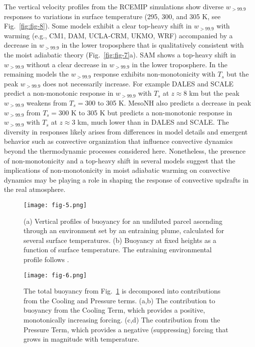 \documentclass[draft]{ametsocV6.1}
\begin{document}
The vertical velocity profiles from the RCEMIP simulations show diverse $w_{>99.9}$ responses to variations in surface temperature (295, 300, and 305 K, see Fig.~\ref{fig:fig-8}). Some models exhibit a clear top-heavy shift in $w_{>99.9}$ with warming (e.g., CM1, DAM, UCLA-CRM, UKMO, WRF) accompanied by a decrease in $w_{>99.9}$ in the lower troposphere that is qualitatively consistent with the moist adiabatic theory (Fig.~\ref{fig:fig-7}a). SAM shows a top-heavy shift in $w_{>99.9}$ without a clear decrease in $w_{>99.9}$ in the lower troposphere. In the remaining models the $w_{>99.9}$ response exhibits non-monotonicity with $T_s$ but the peak $w_{>99.9}$ does not necessarily increase. For example DALES and SCALE predict a non-monotonic response in $w_{>99.9}$ with $T_s$ at $z\approx8$ km but the peak $w_{>99.9}$ weakens from $T_s=300$ to 305 K. MesoNH also predicts a decrease in peak $w_{>99.9}$ from $T_s=300$ K to 305 K but predicts a non-monotonic response in $w_{>99.9}$ with $T_s$ at $z\approx3$ km, much lower than in DALES and SCALE. The diversity in responses likely arises from differences in model details and emergent behavior such as convective organization that influence convective dynamics beyond the thermodynamic processes considered here. Nonetheless, the presence of non-monotonicity and a top-heavy shift in several models suggest that the implications of non-monotonicity in moist adiabatic warming on convective dynamics may be playing a role in shaping the response of convective updrafts in the real atmosphere.

\begin{figure}[htbp]
 \centering
 \texttt{[image: fig-5.png]}\\
 \caption{(a) Vertical profiles of buoyancy for an undiluted parcel ascending through an environment set by an entraining plume, calculated for several surface temperatures. (b) Buoyancy at fixed heights as a function of surface temperature. The entraining environmental profile follows \cite{romps2016}.}\label{fig:fig-5}
\end{figure}

\begin{figure}[htbp]
 \centering
 \texttt{[image: fig-6.png]}\\
 \caption{The total buoyancy from Fig.~\ref{fig:fig-5} is decomposed into contributions from the Cooling and Pressure terms. (a,b) The contribution to buoyancy from the Cooling Term, which provides a positive, monotonically increasing forcing. (c,d) The contribution from the Pressure Term, which provides a negative (suppressing) forcing that grows in magnitude with temperature.}\label{fig:fig-6}
\end{figure}
\end{document}
